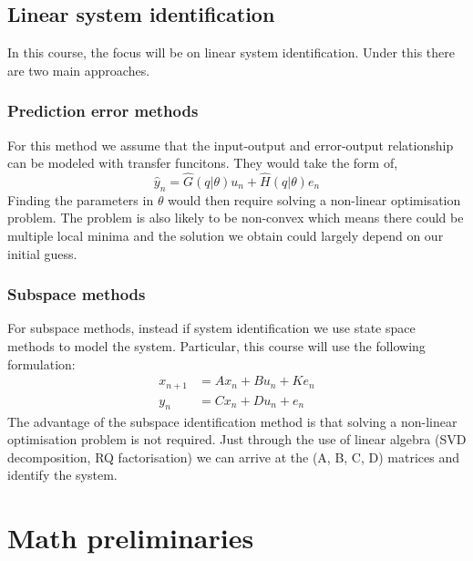 \subsection{Linear system identification}
In this course, the focus will be on linear system identification. Under this there are two main approaches. 
\subsubsection{Prediction error methods}
For this method we assume that the input-output and error-output relationship can be modeled with transfer funcitons. They would take the form of, 
\begin{equation}
	\hat{y}_{n} = \hat{G}(q|\theta)u_{n} + \hat{H}(q|\theta)e_{n}
\end{equation}
Finding the parameters in $\theta$ would then require solving a non-linear optimisation problem. The problem is also likely to be non-convex which means there could be multiple local minima and the solution we obtain could largely depend on our initial guess. 
\subsubsection{Subspace methods}
For subspace methods, instead if system identification we use state space methods to model the system. Particular, this course will use the following formulation: 
\begin{align}
	x_{n+1} &= Ax_{n} + Bu_{n} + Ke_{n}\\
	y_{n} &= Cx_{n} + Du_{n} + e_{n}
\end{align}
The advantage of the subspace identification method is that solving a non-linear optimisation problem is not required. Just through the use of linear algebra (SVD decomposition, RQ factorisation) we can arrive at the (A, B, C, D) matrices and identify the system. 
\section{Math preliminaries}

